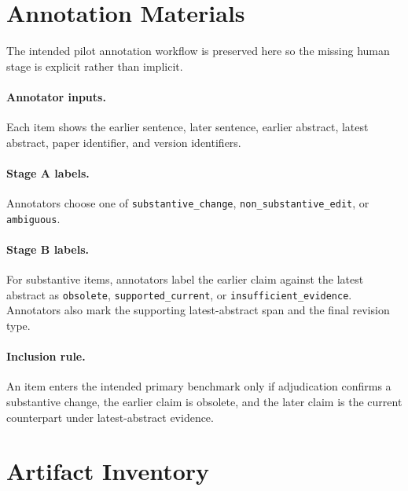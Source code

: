 \documentclass{article}
\begin{document}



\appendix

\section{Annotation Materials}
\label{app:annotation}

The intended pilot annotation workflow is preserved here so the missing human stage is explicit rather than implicit.

\paragraph{Annotator inputs.}
Each item shows the earlier sentence, later sentence, earlier abstract, latest abstract, paper identifier, and version identifiers.

\paragraph{Stage A labels.}
Annotators choose one of \texttt{substantive\_change}, \texttt{non\_substantive\_edit}, or \texttt{ambiguous}.

\paragraph{Stage B labels.}
For substantive items, annotators label the earlier claim against the latest abstract as \texttt{obsolete}, \texttt{supported\_current}, or \texttt{insufficient\_evidence}. Annotators also mark the supporting latest-abstract span and the final revision type.

\paragraph{Inclusion rule.}
An item enters the intended primary benchmark only if adjudication confirms a substantive change, the earlier claim is obsolete, and the later claim is the current counterpart under latest-abstract evidence.

\section{Artifact Inventory}
\label{app:inventory}
\end{document}
